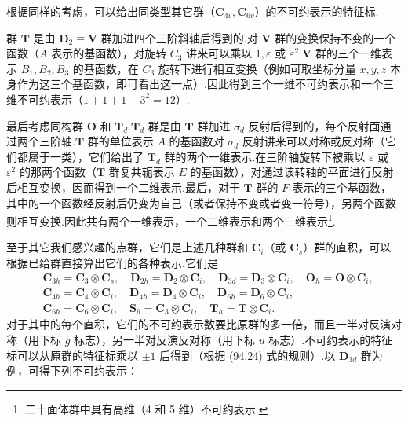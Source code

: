 根据同样的考虑，可以给出同类型其它群（$\boldsymbol{C}_{4v},\boldsymbol{C}_{6v}$）的不可约表示的特征标.

群 $\boldsymbol{T}$ 是由 $\boldsymbol{D}_2\equiv\boldsymbol{V}$ 群加进四个三阶斜轴后得到的.对 $\boldsymbol{V}$ 群的变换保持不变的一个函数（$A$ 表示的基函数），对旋转 $C_3$ 讲来可以乘以 $1,\varepsilon$ 或 $\varepsilon^2$.$\boldsymbol{V}$ 群的三个一维表示 $B_1,B_2,B_3$ 的基函数，在 $C_3$ 旋转下进行相互变换（例如可取坐标分量 $x,y,z$ 本身作为这三个基函数，即可看出这一点）.因此得到三个一维不可约表示和一个三维不可约表示（$1+1+1+3^2=12$）.

最后考虑同构群 $\boldsymbol{O}$ 和 $\boldsymbol{T}_d$.$\boldsymbol{T}_d$ 群是由 $\boldsymbol{T}$ 群加进 $\sigma_d$ 反射后得到的，每个反射面通过两个三阶轴.$\boldsymbol{T}$ 群的单位表示 $A$ 的基函数对 $\sigma_d$ 反射讲来可以对称或反对称（它们都属于一类），它们给出了 $\boldsymbol{T}_d$ 群的两个一维表示.在三阶轴旋转下被乘以 $\varepsilon$ 或 $\varepsilon^2$ 的那两个函数（$\boldsymbol{T}$ 群复共轭表示 $E$ 的基函数），对通过该转轴的平面进行反射后相互变换，因而得到一个二维表示.最后，对于 $\boldsymbol{T}$ 群的 $F$ 表示的三个基函数，其中的一个函数经反射后仍变为自己（或者保持不变或者变一符号），另两个函数则相互变换.因此共有两个一维表示，一个二维表示和两个三维表示\footnote{二十面体群中具有高维（4 和 5 维）不可约表示.}.

至于其它我们感兴趣的点群，它们是上述几种群和 $\boldsymbol{C}_i$（或 $\boldsymbol{C}_s$）群的直积，可以根据已给群直接算出它们的各种表示.它们是
\begin{equation*}
\begin{aligned}
  &\boldsymbol{C}_{3h}=\boldsymbol{C}_3\otimes\boldsymbol{C}_s,\quad
   \boldsymbol{D}_{2h}=\boldsymbol{D}_2\otimes\boldsymbol{C}_i,\quad
   \boldsymbol{D}_{3d}=\boldsymbol{D}_3\otimes\boldsymbol{C}_i,\quad
   \boldsymbol{O}_h=\boldsymbol{O}\otimes\boldsymbol{C}_i,\\
  &\boldsymbol{C}_{4h}=\boldsymbol{C}_4\otimes\boldsymbol{C}_i,\quad
   \boldsymbol{D}_{4h}=\boldsymbol{D}_4\otimes\boldsymbol{C}_i,\quad
   \boldsymbol{D}_{6h}=\boldsymbol{D}_6\otimes\boldsymbol{C}_i,\\
  &\boldsymbol{C}_{6h}=\boldsymbol{C}_6\otimes\boldsymbol{C}_i,\quad
   \boldsymbol{S}_6=\boldsymbol{C}_3\otimes\boldsymbol{C}_i,\quad
   \boldsymbol{T}_h=\boldsymbol{T}\otimes\boldsymbol{C}_i.
\end{aligned}
\end{equation*}
对于其中的每个直积，它们的不可约表示数要比原群的多一倍，而且一半对反演对称（用下标 $g$ 标志），另一半对反演反对称（用下标 $u$ 标志）.不可约表示的特征标可以从原群的特征标乘以 $\pm1$ 后得到（根据 (94.24) 式的规则）.以 $\boldsymbol{D}_{3d}$ 群为例，可得下列不可约表示：

